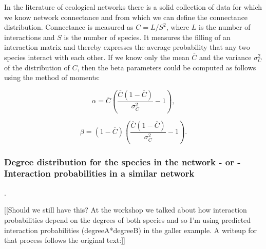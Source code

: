 \documentclass[12pt]{article}
\begin{document}
          In the literature of ecological networks there is a solid collection of data for which we know network connectance and from which we can define the connectance distribution. Connectance is measured as $C = L/S^2$, where $L$ is the number of interactions and $S$ is the number of species. It measures the filling of an interaction matrix and thereby expresses the average probability that any two species interact with each other. If we know only the mean $\overline{C}$ and the variance $\sigma_C^2$ of the distribution of $C$,
          then the beta parameters could be computed as follows using the method of moments:

          \begin{equation}
          \alpha = \overline{C}(\frac{\overline{C}(1-\overline{C})}{\sigma_C^2}-1) ,
          \end{equation}

          \begin{equation}
          \beta = (1-\overline{C})(\frac{\overline{C}(1-\overline{C})}{\sigma_C^2}-1) .
          \end{equation}
    


      \subsubsection*{Degree distribution for the species in the network - or - Interaction probabilities in a similar network}.

          [[Should we still have this? At the workshop we talked about how interaction probabilities depend on the degrees of both species and so I'm using predicted interaction probabilities (degreeA*degreeB) in the galler example. A writeup for that process follows the original text:]]
\end{document}
